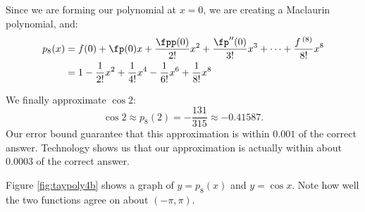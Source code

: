 {Since we are forming our polynomial at $x=0$, we are creating a Maclaurin polynomial, and:
\begin{align*}
p_8(x) &= f(0) + \fp(0)x + \frac{\fpp(0)}{2!}x^2 + \frac{\fp''(0)}{3!}x^3 + \cdots +\frac{f\,^{(8)}}{8!}x^8\\
		&=  1-\frac{1}{2!}x^2+\frac{1}{4!}x^4-\frac{1}{6!}x^6+\frac{1}{8!}x^8
\end{align*}

We finally approximate $\cos 2$:
$$\cos 2 \approx p_8(2) = -\frac{131}{315} \approx -0.41587.$$ Our error bound guarantee that this approximation is within $0.001$ of the correct answer. Technology shows us that our approximation is actually within about $0.0003$ of the correct answer.

Figure \ref{fig:taypoly4b} shows a graph of $y=p_8(x)$ and $y=\cos x$. Note how well the two functions agree on about $(-\pi,\pi)$.
}\clearpage%

